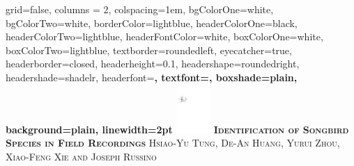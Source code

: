 \documentclass[portrait,final,paperwidth=31truein,paperheight=38truein,fontscale=0.35, margin=1truein]{baposter}
\begin{document}



\begin{poster}%
  {
  grid=false,
  columns = 2,
  colspacing=1em,
  bgColorOne=white,
  bgColorTwo=white,
  borderColor=lightblue,
  headerColorOne=black,
  headerColorTwo=lightblue,
  headerFontColor=white,
  boxColorOne=white,
  boxColorTwo=lightblue,
  textborder=roundedleft,
  eyecatcher=true,
  headerborder=closed,
  headerheight=0.1\textheight,
  headershape=roundedright,
  headershade=shadelr,
  headerfont=\Large\bf\textsc, %
  textfont={\setlength{\parindent}{1.5em}},
  boxshade=plain,
  background=plain,
  linewidth=2pt
  }
  {\includegraphics[height=5em]{images/graph_occluded.pdf}}
  {\bf\textsc{Identification of Songbird Species in Field Recordings}\vspace{0.5em}}
  {\textsc{Hsiao-Yu Tung, De-An Huang, Yurui Zhou, Xiao-Feng Xie and Joseph Russino }}

\end{poster}
\end{document}
